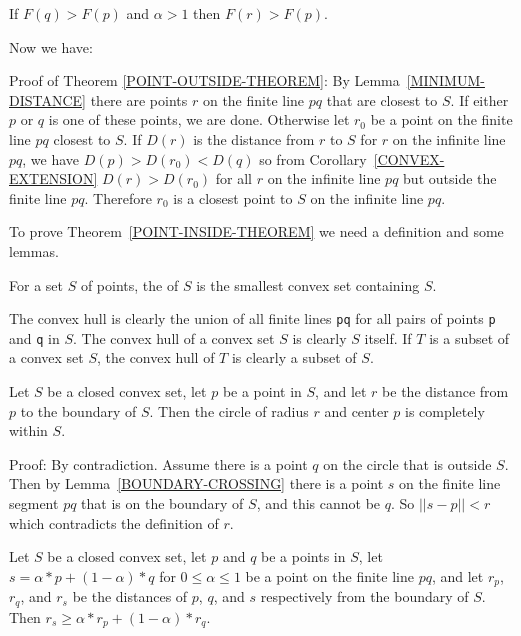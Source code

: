\documentclass[12pt]{article}
\begin{document}
\begin{corollary}\label{CONVEX-EXTENSION}
If $F(q)> F(p)$ and $\alpha>1$ then $F(r)> F(p)$.
\end{corollary}

Now we have:

\begin{indpar}{0.2in}
Proof of Theorem \ref{POINT-OUTSIDE-THEOREM}:
By Lemma~\ref{MINIMUM-DISTANCE} there are points $r$ on the
finite line $pq$ that are closest to $S$.  If either $p$ or $q$ is
one of these points, we are done.  Otherwise
let $r_0$ be a point on the finite line $pq$ closest to $S$.
If $D(r)$ is the distance from $r$ to $S$ for $r$ on the infinite line $pq$,
we have $D(p)>D(r_0)<D(q)$ so from Corollary~\ref{CONVEX-EXTENSION}
$D(r)>D(r_0)$ for all $r$ on the infinite line $pq$ but outside the
finite line $pq$.  Therefore $r_0$ is a closest point to $S$ on the
infinite line $pq$.
\end{indpar}


To prove Theorem~\ref{POINT-INSIDE-THEOREM}
we need a definition and some lemmas.

\begin{definition}
For a set $S$ of points, the  of $S$ is the
smallest convex set containing $S$.
\end{definition}

The convex hull is clearly the union of all finite lines {\tt pq} for
all pairs of points {\tt p} and {\tt q} in $S$.  The convex hull of
a convex set $S$ is clearly $S$ itself.
If $T$ is a subset of a convex set $S$,
the convex hull of $T$ is clearly a subset of $S$.

\begin{lemma}
Let $S$ be a closed convex set, let $p$ be a point in $S$, and
let $r$ be the distance from $p$ to the boundary of $S$.  Then
the circle of radius $r$ and center $p$ is completely within $S$.
\end{lemma}

\begin{indpar}{0.2in}
Proof:  By contradiction.  Assume there is a point $q$ on the circle
that is outside $S$.  Then by Lemma~\ref{BOUNDARY-CROSSING} there is
a point $s$ on the finite line segment $pq$ that is on the boundary of
$S$, and this cannot be $q$.  So $||s-p||<r$ which contradicts the
definition of $r$.
\end{indpar}

\begin{lemma}\label{LINE-INSIDE-LEMMA}
Let $S$ be a closed convex set, let $p$ and $q$ be a points in $S$,
let $s=\alpha*p+(1-\alpha)*q$ for $0\le\alpha\le 1$ be a point on the
finite line $pq$, and let $r_p$, $r_q$, and $r_s$ be the distances
of $p$, $q$, and $s$ respectively from the boundary of $S$.
Then $r_s\ge\alpha*r_p+(1-\alpha)*r_q$.
\end{lemma}
\end{document}
